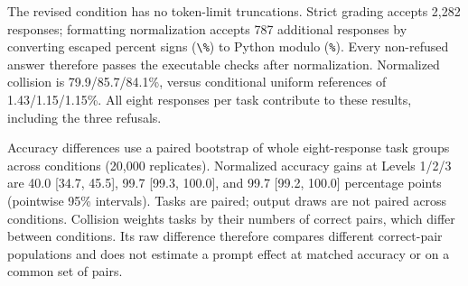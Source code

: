 The revised condition has no token-limit truncations. Strict grading
accepts 2,282 responses; formatting normalization accepts 787 additional responses
by converting escaped percent signs (\verb|\%|) to Python modulo (\verb|%|).
Every non-refused answer therefore passes the executable checks after normalization.
Normalized collision is 79.9/85.7/84.1\%, versus conditional uniform references
of 1.43/1.15/1.15\%. All eight responses per task contribute to these results, including the three refusals.

Accuracy differences use a paired bootstrap of whole eight-response task groups
across conditions (20,000 replicates). Normalized accuracy gains at Levels 1/2/3 are
40.0 [34.7, 45.5], 99.7 [99.3, 100.0], and 99.7 [99.2, 100.0] percentage points
(pointwise 95\% intervals). Tasks are paired; output draws are not paired across conditions.
Collision weights tasks by their numbers of correct pairs, which differ between
conditions. Its raw difference therefore compares different correct-pair populations
and does not estimate a prompt effect at matched accuracy or on a common set of pairs.
